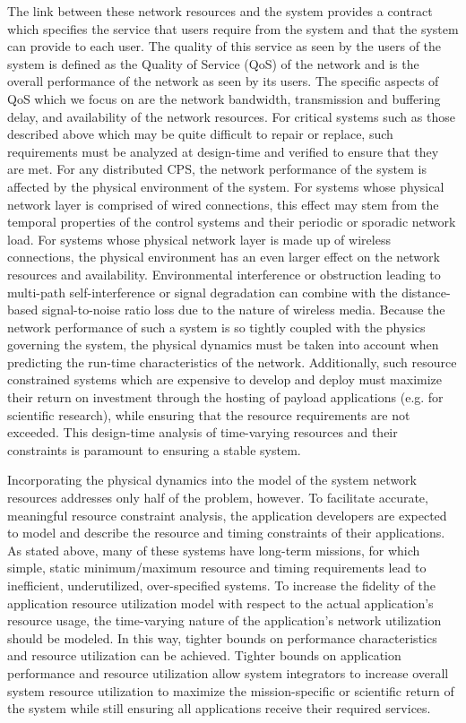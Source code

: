 The link between these network resources and the system provides a contract which specifies the service that users require from the system and that the system can provide to each user.  The quality of this service as seen by the users of the system is defined as the Quality of Service (QoS) of the network and is the overall performance of the network as seen by its users.  The specific aspects of QoS which we focus on are the network bandwidth, transmission and buffering delay, and availability of the network resources.  For critical systems such as those described above which may be quite difficult to repair or replace, such requirements must be analyzed at design-time and verified to ensure that they are met.  For any distributed CPS, the network performance of the system is affected by the physical environment of the system.  For systems whose physical network layer is comprised of wired connections, this effect may stem from the temporal properties of the control systems and their periodic or sporadic network load.  For systems whose physical network layer is made up of wireless connections, the physical environment has an even larger effect on the network resources and availability.  Environmental interference or obstruction leading to multi-path self-interference or signal degradation can combine with the distance-based signal-to-noise ratio loss due to the nature of wireless media.  Because the network performance of such a system is so tightly coupled with the physics governing the system, the physical dynamics must be taken into account when predicting the run-time characteristics of the network.  Additionally, such resource constrained systems which are expensive to develop and deploy must maximize their return on investment through the hosting of payload applications (e.g. for scientific research), while ensuring that the resource requirements are not exceeded.  This design-time analysis of time-varying resources and their constraints is paramount to ensuring a stable system.  

Incorporating the physical dynamics into the model of the system network resources addresses only half of the problem, however.  To facilitate accurate, meaningful resource constraint analysis, the application developers are expected to model and describe the resource and timing constraints of their applications.  As stated above, many of these systems have long-term missions, for which simple, static minimum/maximum resource and timing requirements lead to inefficient, underutilized, over-specified systems.  To increase the fidelity of the application resource utilization model with respect to the actual application's resource usage, the time-varying nature of the application's network utilization should be modeled.  In this way, tighter bounds on performance characteristics and resource utilization can be achieved.  Tighter bounds on application performance and resource utilization allow system integrators to increase overall system resource utilization to maximize the mission-specific or scientific return of the system while still ensuring all applications receive their required services.  

